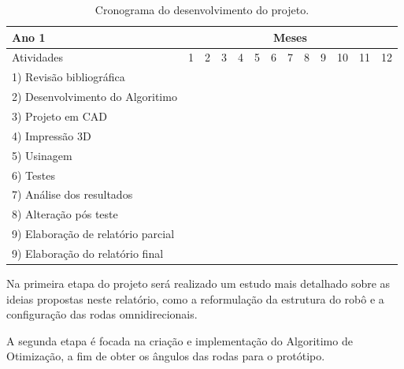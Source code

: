 \documentclass[deposito, acronym, symbols]{fei}
\begin{document}
\newcommand{\X}{\cellcolor{grey}}
\newcommand{\Y}{\cellcolor{blue}}
\begin{table}[!htb]
  \centering
    \caption{Cronograma do desenvolvimento do projeto.}\label{tab:cronograma}
    \scalebox{0.9}
    {\begin{tabular}{>{\raggedright}p{}|c|c|c|c|c|c|c|c|c|c|c|c|}
      \cline{2-13}
        Ano 1 & \multicolumn{12}{c|}{Meses} \\ \hline
        Atividades                       &  1 &  2 &  3 &  4 &  5 &  6 &  7 &  8 &  9 & 10 & 11 & 12 \\ \hline \hline
        \small 1) Revisão bibliográfica            & \Y & \Y & \Y &  &  &  &  &  & &  &  &  \\ \hline
        \small 2) Desenvolvimento do Algoritimo   &  &  & \Y & \Y &\Y  &\Y  &  &  & &  &  &    \\ \hline
        \small 3) Projeto em CAD                  &  &  &  &  & &\X  &\X  &    &    &    &    &    \\ \hline
        \small 4) Impressão 3D                    &  &  &  &   &  & &\X   &\X  & & & &  \\ \hline
        \small 5) Usinagem                 &    &    &    &    &    &    &    &  &    & \X &\X   &  \\ \hline
        \small 6) Testes &    &    &    &    &    &    &    &\X    &\X    &    &\X    &    \\ \hline
        \small 7) Análise dos resultados           &    &    &    &    &    &    &    &    &\X    &    &\X    &    \\ \hline
        \small 8) Alteração pós teste &    &    &    &    &  &  &  &    &\X    &    &    &    \\ \hline
        \small 9) Elaboração de relatório parcial &    &    &    &    & \Y & \Y &    &    &    &    &    &    \\ \hline
        \small 9) Elaboração do relatório final  &    &    &    &    &  &  &    &    &    &    & \X   & \X   \\ \hline
    \end{tabular}}
\end{table}

Na primeira etapa do projeto será realizado um estudo mais detalhado sobre as ideias propostas neste relatório, como a reformulação da estrutura do robô e a configuração das rodas omnidirecionais. 

A segunda etapa é focada na criação e implementação do Algoritimo de Otimização, a fim de obter os ângulos das rodas para o protótipo.
\end{document}

